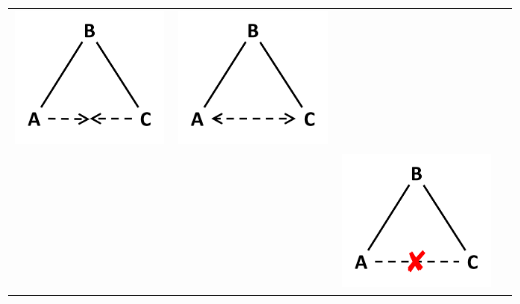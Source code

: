 \begin{table}[]
\begin{tabularx}{\textwidth}{p{3.5cm}p{3.5cm}p{3.5cm}p{3.5cm}}
\includegraphics[width=0.7\linewidth]{Images/TG_brokerage_1} \end{minipage}  & \begin{minipage}{.2\textwidth} \centering \includegraphics[width=0.7\linewidth]{Images/TI_brokerage} \end{minipage}   \\
	&  & \begin{minipage}{.2\textwidth} \centering \includegraphics[width=0.7\linewidth]{Images/TG_brokerage_2} \end{minipage}  &  \\ \midrule

\end{tabularx}
\end{table}
